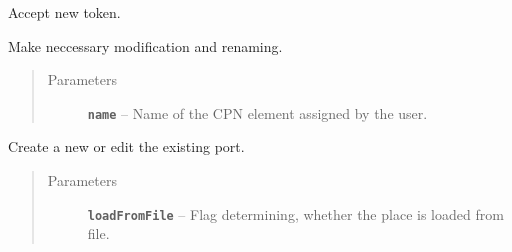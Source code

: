 \documentclass[a4paper,10pt,english]{sphinxmanual}
\begin{document}
\begin{fulllineitems}
\begin{fulllineitems}
\begin{quote}
\begin{description}
\end{description}\end{quote}

\end{fulllineitems}


\begin{fulllineitems}
\label{model_link:model.PlaceItem.PlaceItem.newTokenValue}
Accept new token.

\end{fulllineitems}


\begin{fulllineitems}
\label{model_link:model.PlaceItem.PlaceItem.renameModifications}
Make neccessary modification and renaming.
\begin{quote}\begin{description}
\item[{Parameters}] \leavevmode
\textbf{\texttt{name}} -- Name of the CPN element assigned by the user.

\end{description}\end{quote}

\end{fulllineitems}


\begin{fulllineitems}
\label{model_link:model.PlaceItem.PlaceItem.setPort}
Create a new  or edit the existing port.
\begin{quote}\begin{description}
\item[{Parameters}] \leavevmode
\textbf{\texttt{loadFromFile}} -- Flag determining, whether the place is loaded from file.

\end{description}\end{quote}

\end{fulllineitems}



\end{fulllineitems}
\end{document}
